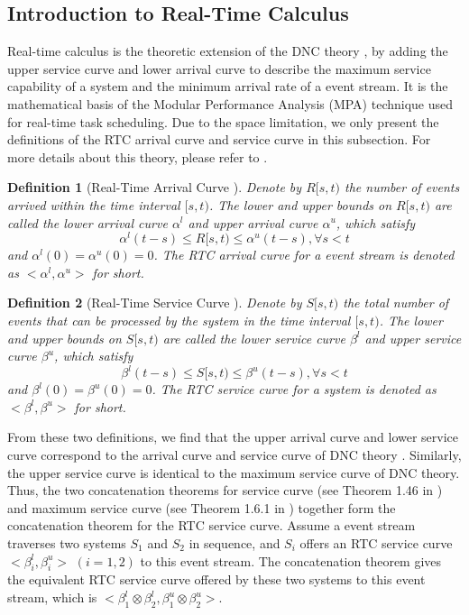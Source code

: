 \documentclass[10pt,journal]{IEEEtran}
\newtheorem{definition}{Definition}
\begin{document}
\subsection{Introduction to Real-Time Calculus}\label{intrortc}
Real-time calculus \cite{1253607} is the theoretic extension of the DNC theory \cite{Boudec2001Network}, by adding the upper service curve and lower arrival curve to describe the maximum service capability of a system and the minimum arrival rate of a event stream. It is the mathematical basis of the Modular Performance Analysis (MPA) \cite{Wandeler2006System} technique used for real-time task scheduling. Due to the space limitation, we only present the definitions of the RTC arrival curve and service curve in this subsection. For more details about this theory, please refer to \cite{1253607}.
\begin{definition}[Real-Time Arrival Curve \cite{1253607}]\label{acu}
Denote by $R[s,t)$ the number of events arrived within the time interval $[s,t)$. The lower and upper bounds on $R[s,t)$ are called the lower arrival curve $\alpha^l$ and upper arrival curve $\alpha^u$, which satisfy
$$\alpha^l(t-s)\leq R[s,t)\leq \alpha^u(t-s),\forall s<t$$
and $\alpha^l(0)=\alpha^u(0)=0$. The RTC arrival curve for a event stream is denoted as $<\alpha^l,\alpha^u>$ for short.
\end{definition}

\begin{definition}[Real-Time Service Curve \cite{1253607}]
Denote by $S[s,t)$ the total number of events that can be processed by the system in the time interval $[s,t)$. The lower and upper bounds on $S[s,t)$ are called the lower service curve $\beta^l$ and upper service curve $\beta^u$, which satisfy
$$\beta^l(t-s)\leq S[s,t)\leq \beta^u(t-s),\forall s<t$$
and $\beta^l(0)=\beta^u(0)=0$. The RTC service curve for a system is denoted as $<\beta^l,\beta^u>$ for short.
\end{definition}

From these two definitions, we find that the upper arrival curve and lower service curve correspond to the arrival curve and service curve of DNC theory \cite{Boudec2001Network}. Similarly, the upper service curve is identical to the maximum service curve of DNC theory. Thus, the two concatenation theorems for service curve (see Theorem 1.46 in \cite{Boudec2001Network}) and maximum service curve (see Theorem 1.6.1 in \cite{Boudec2001Network}) together form the concatenation theorem for the RTC service curve. Assume a event stream traverses two systems $S_1$ and $S_2$ in sequence, and $S_i$ offers an RTC service curve $<\beta^l_i,\beta^u_i>$ $(i=1,2)$ to this event stream. The concatenation theorem gives the equivalent RTC service curve offered by these two systems to this event stream, which is $<\beta^l_1\otimes\beta^l_2,\beta^u_1\otimes\beta^u_2>$.
\end{document}
